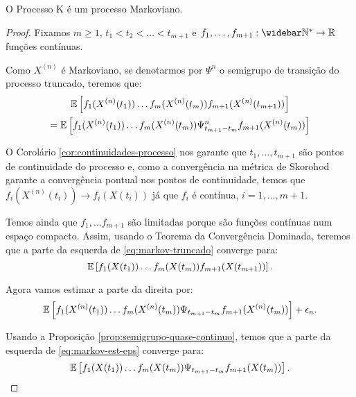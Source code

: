 \begin{teorema}
  \label{teo:proc_markov}
  O Processo K é um processo Markoviano.
\end{teorema}

\begin{proof}
  Fixamos $m \geq 1$, $t_1 < t_2 < \ldots < t_{m+1}$ e $f_1, \ldots,
  f_{m+1} : \Nzb \to \R$ funções contínuas.

  Como $X^{(n)}$ é Markoviano, se denotarmos por $\Psi^n$ o semigrupo
  de transição do processo truncado, teremos que:
  \begin{gather}
    \label{eq:markov-truncado}
    {\mathbb{E}} \left[
      f_{1}(X^{(n)}(t_{1})) 
      \ldots
      f_{m}(X^{(n)}(t_{m})) 
      f_{m+1}(X^{(n)}(t_{m+1})) 
    \right] \\
    = {\mathbb{E}} \left[
      f_{1}(X^{(n)}(t_{1})) 
      \ldots
      f_{m}(X^{(n)}(t_{m})) 
      \Psi^n_{t_{m+1} - t_{m}} f_{m+1} (X^{(n)}(t_{m})) 
    \right]\notag
  \end{gather}

  O Corolário \ref{cor:continuidades-processo} nos garante que \qc
  $t_1, \ldots, t_{m+1}$ são pontos de continuidade do processo e,
  como a convergência na métrica de Skorohod garante a convergência
  pontual nos pontos de continuidade, temos que $f_i(X^{(n)}(t_i)) \to
  f_i(X(t_i))$ \qc já que $f_i$ é contínua, $i = 1, \ldots, m+1$.

  Temos ainda que $f_1, \ldots f_{m+1}$ são limitadas porque são
  funções contínuas num espaço compacto. Assim, usando o Teorema da
  Convergência Dominada, teremos que a parte da esquerda de
  \eqref{eq:markov-truncado} converge para:
  \begin{displaymath}
    {\mathbb{E}} \left[
      f_{1}(X(t_{1})) 
      \ldots
      f_{m}(X(t_{m})) 
      f_{m+1}(X(t_{m+1})) 
    \right].
  \end{displaymath}

  Agora vamos estimar a parte da direita por:
  \begin{equation}
    \label{eq:markov-est-eps}
    {\mathbb{E}} \left[
      f_{1}(X^{(n)}(t_{1})) 
      \ldots
      f_{m}(X^{(n)}(t_{m})) 
      \Psi_{t_{m+1} - t_{m}} f_{m+1} (X^{(n)}(t_{m})) 
    \right] + \epsilon_n.
  \end{equation}

  Usando a Proposição \ref{prop:semigrupo-quase-continuo}, temos que a
  parte da esquerda de \eqref{eq:markov-est-eps} converge para:
  \begin{displaymath}
    {\mathbb{E}} \left[
      f_{1}(X(t_{1})) 
      \ldots
      f_{m}(X(t_{m})) 
      \Psi_{t_{m+1} - t_{m}} f_{m+1} (X(t_{m})) 
    \right].
  \end{displaymath}


\end{proof}
